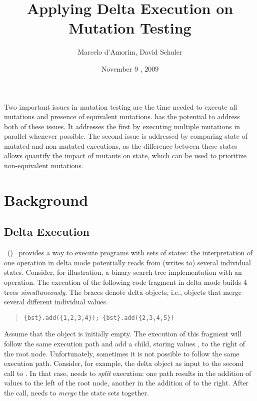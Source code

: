 \documentclass[10pt]{article}
\title{Applying Delta Execution on Mutation Testing}
\author{Marcelo d'Amorim, David Schuler} %
\date{November 9 , 2009}                 %
\begin{document}
\maketitle                               %

Two important issues in mutation testing are the time needed to
execute all mutations and presence of equivalent
mutations.  \DE{} has the potential to address both of these issues.
It addresses the first by executing multiple mutations in parallel
whenever possible. The second issue is addressed by comparing state of 
mutated and non mutated executions, as the difference between these states
allows quantify the impact of mutants on state, which can be
used to prioritize non-equivalent mutations.

\section{Background}

\subsection{Delta Execution}

\DE{}~(\DEA{})~\cite{damorim-tse-2008} provides a way to execute
programs with sets of states: the interpretation of one operation in
delta mode potentially reads from (writes to) several individual
states.  Consider, for illustration, a binary search tree
implementation with an  operation.  The execution of
the following code fragment in delta mode builds 4 trees
\emph{simultaneously}.   The braces denote delta objects, i.e., objects that
merge several different individual values.

\begin{quote}
\begin{verbatim}
{bst}.add({1,2,3,4}); {bst}.add({2,3,4,5})
\end{verbatim}
\end{quote}

Assume that the  object is initially empty.  The execution
of this fragment will follow the same execution path and add a child,
storing values , to the right of the root node.
Unfortunately, sometimes it is not possible to follow the same
execution path.  Consider, for example, the delta object
 as input to the second call to .  In
that case, \DEA{} needs to \emph{split} execution: one path results in
the addition of values  to the left of the root node,
another in the addition of  to the right.  After the
call, \DEA{} needs to \emph{merge} the state sets together.
\end{document}
